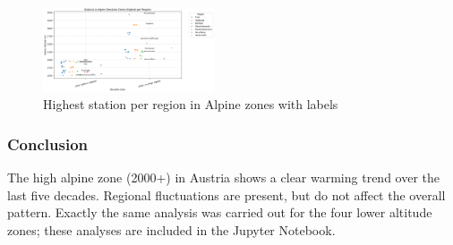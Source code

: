 \begin{figure}[ht]
    \centering
    \includegraphics[width=0.45\textwidth]{img/highest_stations_labeled.png}
    \caption{Highest station per region in Alpine zones with labels}
    \label{fig:highest_stations_labeled}
\end{figure}

\subsubsection{Conclusion}
The high alpine zone (2000+) in Austria shows a clear warming trend over the last five decades. Regional fluctuations are present, but do not affect the overall pattern. Exactly the same analysis was carried out for the four lower altitude zones; these analyses are included in the Jupyter Notebook.

